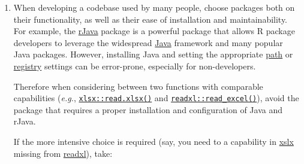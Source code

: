\documentclass[
]{book}
\begin{document}
\begin{enumerate}
\def\labelenumi{\arabic{enumi}.}
\item
  When developing a codebase used by many people, choose packages both on their functionality, as well as their ease of installation and maintainability. For example, the \href{https://CRAN.R-project.org/package=rJava}{rJava} package is a powerful package that allows R package developers to leverage the widespread \href{https://www.java.com/en/}{Java} framework and many popular Java packages. However, installing Java and setting the appropriate \href{https://en.wikipedia.org/wiki/PATH_(variable)}{path} or \href{https://en.wikipedia.org/wiki/Windows_Registry}{registry} settings can be error-prone, especially for non-developers.

  Therefore when considering between two functions with comparable capabilities (\emph{e.g.}, \href{https://CRAN.R-project.org/package=xlsx}{\texttt{xlsx::read.xlsx()}} and \href{https://readxl.tidyverse.org/reference/read_excel.html}{\texttt{readxl::read\_excel()}}), avoid the package that requires a proper installation and configuration of Java and rJava.

  If the more intensive choice is required (say, you need to a capability in \href{https://CRAN.R-project.org/package=xlsx}{xslx} missing from \href{https://readxl.tidyverse.org/}{readxl}), take:


\end{enumerate}
\end{document}
